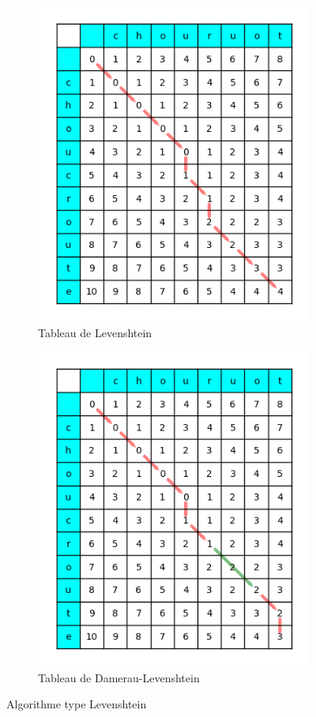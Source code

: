 \documentclass[final, 10pt]{report}
\begin{document}
\begin{figure}
    \centering
    \begin{subfigure}{0.4\textwidth}
        \includegraphics[width=.90\textwidth]{img/Tableau_de_Levenshtein.png}
        \caption{Tableau de Levenshtein}
        \label{fig:tab_levensthein}
    \end{subfigure}
    \begin{subfigure}{0.4\textwidth}
        \includegraphics[width=.90\textwidth]{img/Tableau_de_Damerau-Levenshtein.png}
        \caption{Tableau de Damerau-Levenshtein}
        \label{fig:tab_damerau}
    \end{subfigure}
    \caption{Algorithme type Levenshtein}
    \label{fig:algo_levensthein}
\end{figure}
    
\end{document}
